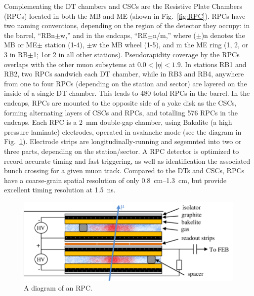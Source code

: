 
Complementing the DT chambers and CSCs are the Resistive Plate Chambers (RPCs) located in both the MB and ME (shown in Fig.~\ref{fig:RPC}). RPCs have two naming conventions, depending on the region of the detector they occupy: in the barrel, ``RBn$\pm$w,'' and in the endcaps, ``RE$\pm$n/m,'' where ($\pm$)n denotes the MB or ME$\pm$ station (1-4), $\pm$w the MB wheel (1-5), and m the ME ring (1, 2, or 3 in RB$\pm$1; 1or 2 in all other stations). Pseudorapidity coverage by the RPCs overlaps with the other muon subsytems at $0.0 < |\eta| < 1.9$. In stations RB1 and RB2, two RPCs sandwich each DT chamber, while in RB3 and RB4, anywhere from one to four RPCs (depending on the station and sector) are layered on the inside of a single DT chamber. This leads to 480 total RPCs in the barrel. In the endcaps, RPCs are mounted to the opposite side of a yoke disk as the CSCs, forming alternating layers of CSCs and RPCs, and totalling 576 RPCs in the endcaps. Each RPC is a \SI{2}{mm} double-gap chamber, using Bakalite (a high pressure laminate) electrodes, operated in avalanche mode (see the diagram in Fig.~\ref{fig:RPCDiagram}). Electrode strips are longitudinally-running and segemnted into two or three parts, depending on the station/sector. A RPC detector is optimized to record accurate timing and fast triggering, as well as identification the associated bunch crossing for a given muon track. Compared to the DTs and CSCs, RPCs have a coarse-grain spatial resolution of only \SIrange{0.8}{1.3}{cm}, but provide excellent timing resolution at \SI{1.5}{ns}.

\begin{figure}[H]
    \centering
    \includegraphics[width=\textwidth]{Images/CMS/RPCDiagram.png}
    \caption{A diagram of an RPC.}
    \label{fig:RPCDiagram}
\end{figure}


